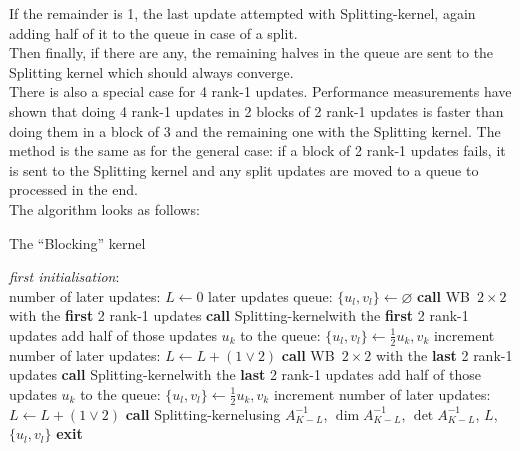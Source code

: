 \documentclass[11pt]{article}
\numberwithin{figure}{section}
\numberwithin{table}{section}
\begin{document}
      If the remainder is 1, the last update attempted with Splitting-kernel, again adding half of it to the queue in case of a split.\\
    
      Then finally, if there are any, the remaining halves in the queue are sent to the Splitting kernel which should always converge.\\
    
      There is also a special case for 4 rank-1 updates. Performance measurements have shown that doing 4 rank-1 updates in 2 blocks of 2 rank-1 updates is faster than doing them in a block of 3 and the remaining one with the Splitting kernel. The method is the same as for the general case: if a block of 2 rank-1 updates fails, it is sent to the Splitting kernel and any split updates are moved to a queue to processed in the end.\\
    
      The algorithm looks as follows:\\
				
      \begin{algorithm}[h]
      	\caption{The ``Blocking'' kernel}\label{algo:blocking}
      	\textit{first initialisation}:\\
      	number of later updates: $L \gets 0$\;
      	later updates queue: $\{u_l, v_l\} \gets \varnothing$\;
      	 {
      		\textbf{call} WB~$2\times 2$ with the  \textbf{first} 2 rank-1 updates\;
      		 {
      			\textbf{call} Splitting-kernel\footnotemark[1] with the \textbf{first} 2 rank-1 updates\;
      			 {
      				add half of those updates $u_k$ to the queue: $\{u_l,v_l\} \gets \frac{1}{2}u_k, v_k$\;
      				increment number of later updates: $L \gets L + (1 \lor 2)$\;
      			}
      		}
      		\textbf{call} WB~$2\times 2$ with the \textbf{last} 2 rank-1 updates\;
      		 {
      			\textbf{call} Splitting-kernel\footnotemark[1] with the \textbf{last} 2 rank-1 updates\;
      			 {
      				add half of those updates $u_k$ to the queue: $\{u_l,v_l\} \gets \frac{1}{2}u_k, v_k$\;
      				increment number of later updates: $L \gets L + (1 \lor 2)$\;
      			}
      		}
      		{
      			\textbf{call} Splitting-kernel\footnotemark[2] using $A^{-1}_{K-L}$, $\dim A^{-1}_{K-L}$, $\det A^{-1}_{K-L} $, $L$, $\{u_l, v_l\}$\;
      		}
      		\textbf{exit}\;
      	}
      \end{algorithm}
\end{document}
